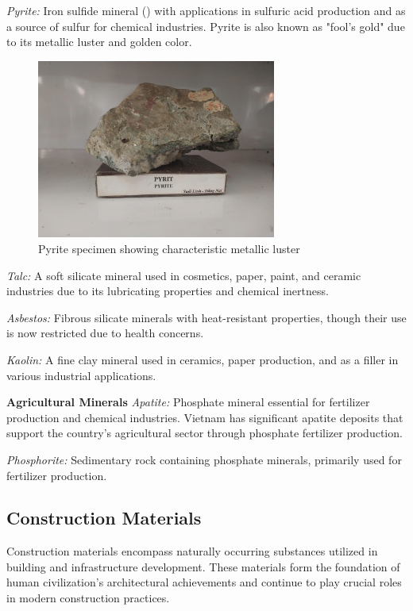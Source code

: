 \textit{Pyrite:} Iron sulfide mineral () with applications in sulfuric acid production and as a source of sulfur for chemical industries. Pyrite is also known as "fool's gold" due to its metallic luster and golden color.

\begin{figure}[H]
\centering
\includegraphics[width=0.7\textwidth]{graphics/pyrite.png}
\caption{Pyrite specimen showing characteristic metallic luster}
\label{fig:pyrite}
\end{figure}

\textit{Talc:} A soft silicate mineral used in cosmetics, paper, paint, and ceramic industries due to its lubricating properties and chemical inertness.

\textit{Asbestos:} Fibrous silicate minerals with heat-resistant properties, though their use is now restricted due to health concerns.

\textit{Kaolin:} A fine clay mineral used in ceramics, paper production, and as a filler in various industrial applications.

\textbf{Agricultural Minerals}
\textit{Apatite:} Phosphate mineral essential for fertilizer production and chemical industries. Vietnam has significant apatite deposits that support the country's agricultural sector through phosphate fertilizer production.

\textit{Phosphorite:} Sedimentary rock containing phosphate minerals, primarily used for fertilizer production.

\subsection{Construction Materials}

Construction materials encompass naturally occurring substances utilized in building and infrastructure development. These materials form the foundation of human civilization's architectural achievements and continue to play crucial roles in modern construction practices.

